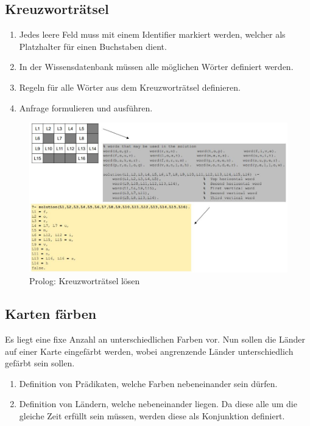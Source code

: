 \subsection{Kreuzworträtsel}
\begin{enumerate}
	\item Jedes leere Feld muss mit einem Identifier markiert werden, welcher als Platzhalter für einen Buchstaben dient.
	\item  In der Wissensdatenbank müssen alle möglichen Wörter definiert werden.
	\item Regeln für alle Wörter aus dem Kreuzworträtsel definieren.
	\item Anfrage formulieren und ausführen.
\end{enumerate}

\begin{figure}[h!]
\centering
\includegraphics[width=1\linewidth]{fig/prolog-kreuzwortraetsel}
\caption{Prolog: Kreuzworträtsel lösen}
\label{fig:prolog-kreuzwortraetsel}
\end{figure}

\subsection{Karten färben}
Es liegt eine fixe Anzahl an unterschiedlichen Farben vor. Nun sollen die Länder auf einer Karte eingefärbt werden, wobei angrenzende Länder unterschiedlich gefärbt sein sollen. 
\begin{enumerate}
	\item Definition von Prädikaten, welche Farben nebeneinander sein dürfen.
	\item Definition von Ländern, welche nebeneinander liegen. Da diese alle um die gleiche Zeit erfüllt sein müssen, werden diese als Konjunktion definiert.
\end{enumerate}

